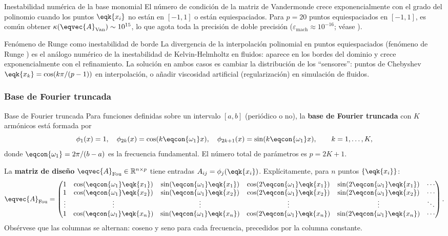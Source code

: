 \begin{observacion}{Inestabilidad numérica de la base monomial}
\label{obs:vandermonde_inestable}
El número de condición de la matriz de Vandermonde crece exponencialmente
con el grado del polinomio cuando los puntos $\eqk{x_i}$ no están en $[-1,1]$ o
están equiespaciados. Para $p = 20$ puntos equiespaciados en $[-1,1]$,
es común obtener $\kappa(\eqvec{A}_{\mathrm{Van}}) \sim 10^{15}$, lo que
agota toda la precisión de doble precisión ($\varepsilon_{\mathrm{mach}}
\approx 10^{-16}$; véase ).
\end{observacion}

\begin{fisicaconexion}{Fenómeno de Runge como inestabilidad de borde}
La divergencia de la interpolación polinomial en puntos equiespaciados
(fenómeno de Runge \cite{runge1901empirische}) es el análogo numérico de
la inestabilidad de Kelvin-Helmholtz en fluidos: aparece en los bordes
del dominio y crece exponencialmente con el refinamiento. La solución en
ambos casos es cambiar la distribución de los ``sensores'': puntos de
Chebyshev $\eqk{x_k} = \cos(k\pi/(p-1))$ en interpolación, o añadir viscosidad
artificial (regularización) en simulación de fluidos.
\end{fisicaconexion}

\subsubsection{Base de Fourier truncada}
\label{sec:fourier}

\begin{definicion}{Base de Fourier truncada}
\label{def:fourier}
Para funciones definidas sobre un intervalo $[a,b]$ (periódico o no), la
\textbf{base de Fourier truncada} con $K$ armónicos está formada por
\[
  \phi_1(x)=1,\quad
  \phi_{2k}(x)=\cos(k\eqcon{\omega_1} x),\quad
  \phi_{2k+1}(x)=\sin(k\eqcon{\omega_1} x),\qquad k=1,\dots,K,
\]
donde $\eqcon{\omega_1} = 2\pi/(b-a)$ es la frecuencia fundamental.
El número total de parámetros es $p = 2K+1$.

La \textbf{matriz de diseño} $\eqvec{A}_{\mathrm{Fou}} \in \mathbb{R}^{n \times p}$
tiene entradas $A_{ij} = \phi_j(\eqk{x_i})$. Explícitamente, para $n$ puntos $\{\eqk{x_i}\}$:
\[
\eqvec{A}_{\mathrm{Fou}} =
\begin{pmatrix}
1 & \cos(\eqcon{\omega_1}\eqk{x_1}) & \sin(\eqcon{\omega_1}\eqk{x_1}) & \cos(2\eqcon{\omega_1}\eqk{x_1}) & \sin(2\eqcon{\omega_1}\eqk{x_1}) & \cdots \\
1 & \cos(\eqcon{\omega_1}\eqk{x_2}) & \sin(\eqcon{\omega_1}\eqk{x_2}) & \cos(2\eqcon{\omega_1}\eqk{x_2}) & \sin(2\eqcon{\omega_1}\eqk{x_2}) & \cdots \\
\vdots & \vdots & \vdots & \vdots & \vdots & \ddots \\
1 & \cos(\eqcon{\omega_1}\eqk{x_n}) & \sin(\eqcon{\omega_1}\eqk{x_n}) & \cos(2\eqcon{\omega_1}\eqk{x_n}) & \sin(2\eqcon{\omega_1}\eqk{x_n}) & \cdots
\end{pmatrix}.
\]
Obsérvese que las columnas se alternan: coseno y seno para cada frecuencia,
precedidos por la columna constante.
\end{definicion}

